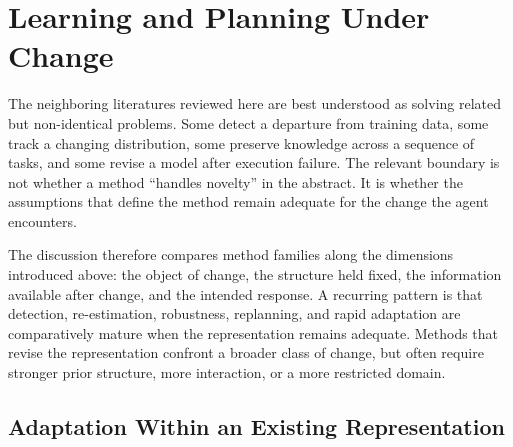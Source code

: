 
\section{Learning and Planning Under Change}
\label{sec:what_field_does}
\label{sec:capabilities_and_gaps}

The neighboring literatures reviewed here are best understood as solving related but non-identical problems.
Some detect a departure from training data, some track a changing distribution, some preserve knowledge across a sequence of tasks, and some revise a model after execution failure.
The relevant boundary is not whether a method ``handles novelty'' in the abstract.
It is whether the assumptions that define the method remain adequate for the change the agent encounters.

The discussion therefore compares method families along the dimensions introduced above: the object of change, the structure held fixed, the information available after change, and the intended response.
A recurring pattern is that detection, re-estimation, robustness, replanning, and rapid adaptation are comparatively mature when the representation remains adequate.
Methods that revise the representation confront a broader class of change, but often require stronger prior structure, more interaction, or a more restricted domain.

\subsection{Adaptation Within an Existing Representation}
\label{sec:fixed_representation_methods}


